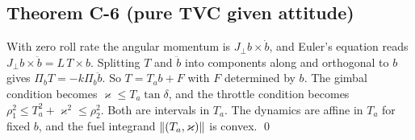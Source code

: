 \subsection{Theorem C-6 (pure TVC given attitude)}
With zero roll rate the angular momentum is $J_\perp b\times\dot b$, and Euler's equation reads $J_\perp b\times\ddot b=L\,T\times b$. Splitting $T$ and $\ddot b$
into components along and orthogonal to $b$ gives $\Pi_bT=-k\Pi_b\ddot b$. So $T=T_ab+F$ with $F$ determined by $b$. The gimbal condition becomes
$\varkappa\le T_a\tan\delta$, and the throttle condition becomes $\rho_1^2\le T_a^2+\varkappa^2\le\rho_2^2$. Both are intervals in $T_a$. The dynamics are
affine in $T_a$ for fixed $b$, and the fuel integrand $\lVert (T_a,\varkappa)\rVert$ is convex. \qed
